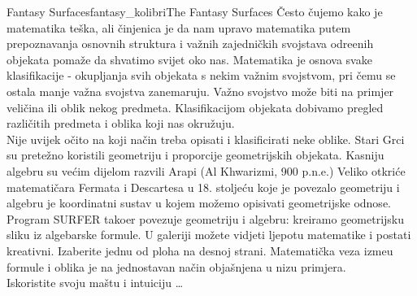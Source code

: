 \begin{surferIntroPage}{Fantasy Surfaces}{fantasy_kolibri}{The Fantasy Surfaces}
\v{C}esto \v{c}ujemo kako je matematika te\v{s}ka, ali \v{c}injenica je da nam upravo matematika putem prepoznavanja osnovnih struktura i va\v{z}nih zajedni\v{c}kih svojstava odre\dj{}enih objekata poma\v{z}e da shvatimo svijet oko nas. Matematika je osnova svake klasifikacije - okupljanja svih objekata s nekim va\v{z}nim svojstvom, pri \v{c}emu se ostala manje va\v{z}na svojstva zanemaruju. Va\v{z}no svojstvo mo\v{z}e biti na primjer veli\v{c}ina ili oblik nekog predmeta. Klasifikacijom objekata dobivamo pregled razli\v{c}itih predmeta i oblika koji nas okru\v{z}uju.  \\

\vspace{0.4cm}
Nije uvijek o\v{c}ito na koji na\v{c}in treba opisati i klasificirati neke oblike. Stari Grci su prete\v{z}no koristili geometriju i proporcije geometrijskih objekata. Kasniju algebru su ve\'{c}im dijelom razvili Arapi (Al Khwarizmi, 900 p.n.e.) Veliko otkri\'{c}e matemati\v{c}ara Fermata i Descartesa u 18. stolje\'{c}u koje je povezalo geometriju i algebru je koordinatni sustav u kojem mo\v{z}emo opisivati geometrijske odnose.   \\
\vspace{0.4cm}
Program SURFER tako\dj{}er povezuje geometriju i algebru: kreiramo geometrijsku sliku iz algebarske formule.
U galeriji mo\v{z}ete vidjeti ljepotu matematike i postati kreativni. Izaberite jednu od ploha na desnoj strani. Matemati\v{c}ka veza izme\dj{}u formule i oblika je na jednostavan na\v{c}in obja\v{s}njena u nizu primjera.
\\
Iskoristite svoju ma\v{s}tu i intuiciju \dots
\end{surferIntroPage}

